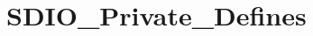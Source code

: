 \hypertarget{group___s_d_i_o___private___defines}{\section{S\-D\-I\-O\-\_\-\-Private\-\_\-\-Defines}
\label{group___s_d_i_o___private___defines}
}
